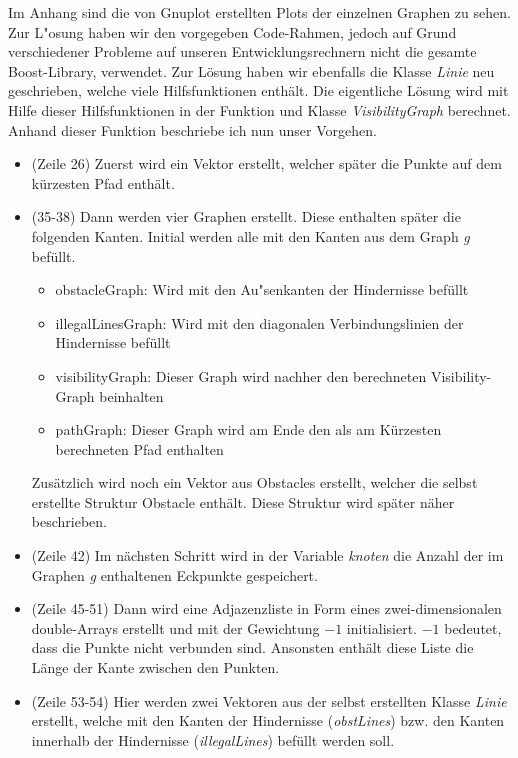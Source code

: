 \documentclass[a4paper]{scrartcl}
\begin{document}
Im Anhang sind die von Gnuplot erstellten Plots der einzelnen Graphen zu sehen.\\

Zur L"osung haben wir den vorgegeben Code-Rahmen, jedoch auf Grund verschiedener Probleme auf unseren Entwicklungsrechnern nicht die gesamte Boost-Library, verwendet. Zur Lösung haben wir ebenfalls die Klasse \textit{Linie} neu geschrieben, welche viele Hilfsfunktionen enthält. Die eigentliche Lösung wird mit Hilfe dieser Hilfsfunktionen in der Funktion und Klasse \textit{VisibilityGraph} berechnet. Anhand dieser Funktion beschriebe ich nun unser Vorgehen.

\begin{itemize}
	\item (Zeile 26) Zuerst wird ein Vektor erstellt, welcher später die Punkte auf dem kürzesten Pfad enthält.
	\item (35-38) Dann werden vier Graphen erstellt. Diese enthalten später die folgenden Kanten. Initial werden alle mit den Kanten aus dem Graph \textit{g} befüllt.
	\begin{itemize}
		\item obstacleGraph: Wird mit den Au"senkanten der Hindernisse befüllt
		\item illegalLinesGraph: Wird mit den diagonalen Verbindungslinien der Hindernisse befüllt
		\item visibilityGraph: Dieser Graph wird nachher den berechneten Visibility-Graph beinhalten
		\item pathGraph: Dieser Graph wird am Ende den als am Kürzesten berechneten Pfad enthalten
	\end{itemize}
	Zusätzlich wird noch ein Vektor aus Obstacles erstellt, welcher die selbst erstellte Struktur Obstacle enthält. Diese Struktur wird später näher beschrieben.
	\item (Zeile 42) Im nächsten Schritt wird in der Variable \textit{knoten} die Anzahl der im Graphen \textit{g} enthaltenen Eckpunkte gespeichert.
	\item (Zeile 45-51) Dann wird eine Adjazenzliste in Form eines zwei-dimensionalen double-Arrays erstellt und mit der Gewichtung $-1$ initialisiert. $-1$ bedeutet, dass die Punkte nicht verbunden sind. Ansonsten enthält diese Liste die Länge der Kante zwischen den Punkten.
	\item (Zeile 53-54) Hier werden zwei Vektoren aus der selbst erstellten Klasse \textit{Linie} erstellt, welche mit den Kanten der Hindernisse (\textit{obstLines}) bzw. den Kanten innerhalb der Hindernisse (\textit{illegalLines}) befüllt werden soll.

\end{itemize}
\end{document}
